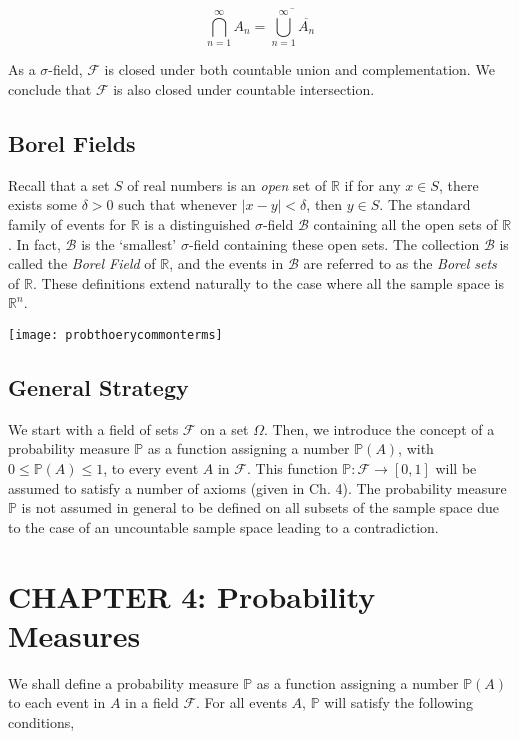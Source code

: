 \documentclass[12pt]{article}
\newcommand{\R}{\mathbb{R}}
\newcommand{\field}{\mathcal{F}}
\begin{document}
\begin{equation*}
\bigcap_{n=1}^{\infty} A_n = \overline{\bigcup_{n=1}^{\infty} \overline{A_n}}
\end{equation*}

\noindent
As a $\sigma$-field, $\field$ is closed under both countable union and complementation. We conclude that $\field$ is also closed under countable intersection.

\subsection*{Borel Fields}
\noindent
Recall that a set $S$ of real numbers is an \textit{open} set of $\R$ if for any $x \in S$, there exists some $\delta > 0$ such that whenever $\lvert x - y \rvert < \delta$, then $y \in S$. The standard family of events for $\R$ is a distinguished $\sigma$-field $\mathcal{B}$ containing all the open sets of $\R$. In fact, $\mathcal{B}$ is the `smallest' $\sigma$-field containing these open sets. The collection $\mathcal{B}$ is called the \textit{Borel Field} of $\R$, and the events in $\mathcal{B}$ are referred to as the \textit{Borel sets} of $\R$. These definitions extend naturally to the case where all the sample space is $\R^n$. 

\begin{center}
\texttt{[image: probthoerycommonterms]}
\end{center}

\noindent
\subsection*{General Strategy}
We start with a field of sets $\field$ on a set $\Omega$. Then, we introduce the concept of a probability measure $\mathbb{P}$ as a function assigning a number $\mathbb{P}(A)$, with $0 \leq \mathbb{P}(A) \leq 1$, to every event $A$ in $\field$. This function $\mathbb{P} : \field \rightarrow [0,1]$ will be assumed to satisfy a number of axioms (given in Ch. 4). The probability measure $\mathbb{P}$ is not assumed in general to be defined on all subsets of the sample space due to the case of an uncountable sample space leading to a contradiction.

\section*{CHAPTER 4: Probability Measures}
We shall define a probability measure $\mathbb{P}$ as a function assigning a number $\mathbb{P}(A)$ to each event in $A$ in a field $\field$. For all events $A$, $\mathbb{P}$ will satisfy the following conditions,
\end{document}
